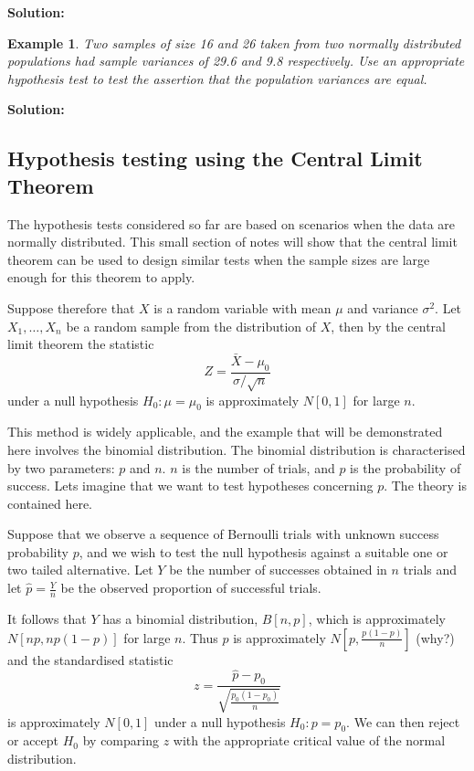 \documentclass[12pt]{article}
\newtheorem{example}[theorem]{Example}
\begin{document}
\begin{mdframed}
\bf{Solution:}
\textcolor[rgb]{1.00,1.00,1.00}{\lipsum[1-4]}
\end{mdframed}

\begin{example}
Two samples of size 16 and 26 taken from two normally distributed populations had sample variances of 29.6 and 9.8 respectively. Use an appropriate hypothesis test to test the assertion that the population variances are equal.
\end{example}

\begin{mdframed}
\bf{Solution:}
\textcolor[rgb]{1.00,1.00,1.00}{\lipsum[1-4]}
\end{mdframed}


\subsection{Hypothesis testing using the Central Limit Theorem}

The hypothesis tests considered so far are based on scenarios when the data are normally distributed. This small section of notes will show that the central limit theorem can be used to design similar tests when the sample sizes are large enough for this theorem to apply.

Suppose therefore that $X$ is a random variable with mean $\mu$ and variance $\sigma^{2}$. Let $X_{1},\ldots,X_{n}$ be a random sample from the distribution of $X$, then by the central limit theorem the statistic $$Z=\frac{\bar{X}-\mu_{0}}{\sigma/\sqrt{n}}$$ under a null hypothesis $H_{0}:\mu=\mu_{0}$ is approximately $N[0,1]$ for large $n$.

This method is widely applicable, and the example that will be demonstrated here involves the binomial distribution. The binomial distribution is characterised by two parameters: $p$ and $n$. $n$ is the number of trials, and $p$ is the probability of success. Lets imagine that we want to test hypotheses concerning $p$. The theory is contained here.

Suppose that we observe a sequence of Bernoulli trials with unknown success probability $p$, and we wish to test the null hypothesis against a suitable one or two tailed alternative. Let $Y$ be the number of successes obtained in $n$ trials and let $\hat{p}=\frac{Y}{n}$ be the observed proportion of successful trials.

It follows that $Y$ has a binomial distribution, $B[n,p]$, which is approximately $N[np,np(1-p)]$ for large $n$. Thus $\hat{p}$ is approximately $N[p,\frac{p(1-p)}{n}]$ (why?) and the standardised statistic $$z=\frac{\hat{p}-p_0}{\sqrt{\frac{p_0(1-p_0)}{n}}}$$ is approximately $N[0,1]$ under a null hypothesis $H_{0}:p=p_0$. We can then reject or accept $H_{0}$ by comparing $z$ with the appropriate critical value of the normal distribution.
\end{document}
